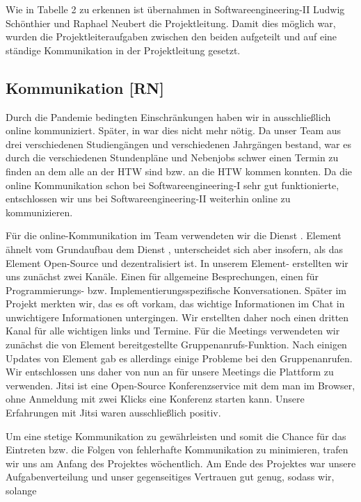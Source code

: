 \documentclass[10pt]{article}
\begin{document}
Wie in Tabelle 2 zu erkennen ist übernahmen in Softwareengineering-II Ludwig Schönthier und Raphael Neubert die 
Projektleitung. Damit dies möglich war, wurden die Projektleiteraufgaben zwischen den beiden aufgeteilt und auf eine 
ständige Kommunikation in der Projektleitung gesetzt.

\subsection{Kommunikation [RN]}
Durch die Pandemie bedingten Einschränkungen haben wir in  ausschließlich online kommuniziert. Später, in  war dies nicht mehr nötig. Da unser Team aus drei verschiedenen
Studiengängen und verschiedenen Jahrgängen bestand, war es durch die verschiedenen Stundenpläne und Nebenjobs 
schwer einen Termin zu finden an dem alle an der HTW sind bzw. an die HTW kommen konnten. Da die online Kommunikation 
schon bei Softwareengineering-I sehr gut funktionierte, entschlossen wir uns bei Softwareengineering-II weiterhin online 
zu kommunizieren.\par
\medskip
Für die online-Kommunikation im Team verwendeten wir die Dienst . Element ähnelt vom Grundaufbau dem 
Dienst , unterscheidet sich aber insofern, als das Element Open-Source und dezentralisiert ist.
In unserem Element- erstellten wir uns zunächst zwei Kanäle. Einen für allgemeine Besprechungen, 
einen für  Programmierungs- bzw. Implementierungsspezifische Konversationen. Später im Projekt merkten wir, das 
es oft vorkam, das wichtige Informationen im Chat in unwichtigere Informationen untergingen. Wir erstellten
daher noch einen dritten Kanal für alle wichtigen links und Termine.
Für die Meetings verwendeten wir zunächst die von Element bereitgestellte Gruppenanrufs-Funktion.
Nach einigen Updates von Element gab es allerdings einige Probleme bei den Gruppenanrufen. Wir entschlossen 
uns daher von nun an für unsere Meetings die Plattform  zu verwenden.
Jitsi ist eine Open-Source Konferenzservice mit dem man im Browser, 
ohne Anmeldung mit zwei Klicks eine Konferenz starten kann. Unsere Erfahrungen mit Jitsi waren ausschließlich positiv.\par
\medskip
Um eine stetige Kommunikation zu gewährleisten und somit die Chance für das Eintreten bzw. die Folgen
von fehlerhafte Kommunikation zu minimieren, trafen wir uns am Anfang des Projektes wöchentlich. Am Ende 
des Projektes war unsere Aufgabenverteilung und unser gegenseitiges Vertrauen gut genug, sodass wir, solange
\end{document}
